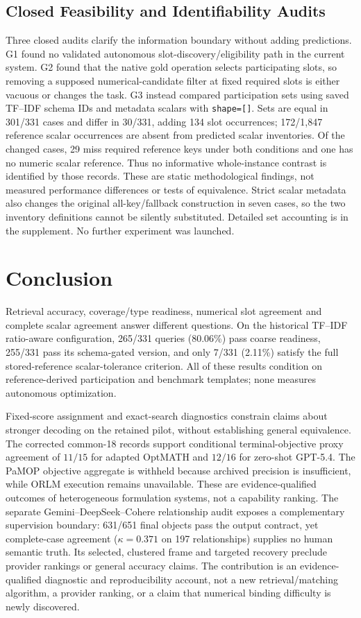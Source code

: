 \documentclass[pdflatex,sn-basic,Numbered]{sn-jnl}
\begin{document}
\subsection{Closed Feasibility and Identifiability Audits}
\label{subsec:closed-audits}
Three closed audits clarify the information boundary without adding predictions. G1 found no validated autonomous slot-discovery/eligibility path in the current system. G2 found that the native gold operation selects participating slots, so removing a supposed numerical-candidate filter at fixed required slots is either vacuous or changes the task. G3 instead compared participation sets using saved TF--IDF schema IDs and metadata scalars with \texttt{shape=[]}. Sets are equal in 301/331 cases and differ in 30/331, adding 134 slot occurrences; 172/1,847 reference scalar occurrences are absent from predicted scalar inventories. Of the changed cases, 29 miss required reference keys under both conditions and one has no numeric scalar reference. Thus no informative whole-instance contrast is identified by those records. These are static methodological findings, not measured performance differences or tests of equivalence. Strict scalar metadata also changes the original all-key/fallback construction in seven cases, so the two inventory definitions cannot be silently substituted. Detailed set accounting is in the supplement. No further experiment was launched.
\section{Conclusion}
\label{sec:conclusion}
Retrieval accuracy, coverage/type readiness, numerical slot agreement and complete scalar agreement answer different questions. On the historical TF--IDF ratio-aware configuration, 265/331 queries (80.06\%) pass coarse readiness, 255/331 pass its schema-gated version, and only 7/331 (2.11\%) satisfy the full stored-reference scalar-tolerance criterion. All of these results condition on reference-derived participation and benchmark templates; none measures autonomous optimization.

Fixed-score assignment and exact-search diagnostics constrain claims about stronger decoding on the retained pilot, without establishing general equivalence. The corrected common-18 records support conditional terminal-objective proxy agreement of $11/15$ for adapted OptMATH and $12/16$ for zero-shot GPT-5.4. The PaMOP objective aggregate is withheld because archived precision is insufficient, while ORLM execution remains unavailable. These are evidence-qualified outcomes of heterogeneous formulation systems, not a capability ranking. The separate Gemini--DeepSeek--Cohere relationship audit exposes a complementary supervision boundary: 631/651 final objects pass the output contract, yet complete-case agreement ($\kappa=0.371$ on 197 relationships) supplies no human semantic truth. Its selected, clustered frame and targeted recovery preclude provider rankings or general accuracy claims. The contribution is an evidence-qualified diagnostic and reproducibility account, not a new retrieval/matching algorithm, a provider ranking, or a claim that numerical binding difficulty is newly discovered.
\backmatter
\end{document}
